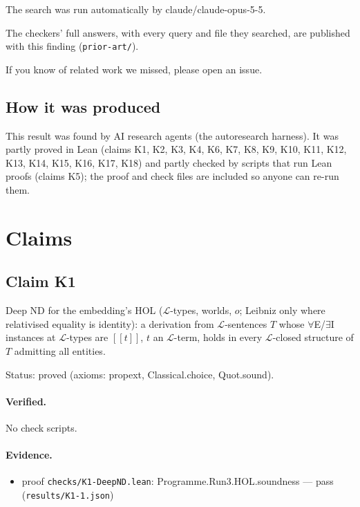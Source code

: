\documentclass{article}
\begin{document}
The search was run automatically by claude/claude-opus-5-5.

The checkers' full answers, with every query and file they searched, are published with this finding (\texttt{prior-art/}).

If you know of related work we missed, please open an issue.

\subsection*{How it was produced}

This result was found by AI research agents (the autoresearch harness). It was partly proved in Lean (claims K1, K2, K3, K4, K6, K7, K8, K9, K10, K11, K12, K13, K14, K15, K16, K17, K18) and partly checked by scripts that run Lean proofs (claims K5); the proof and check files are included so anyone can re-run them.

\section{Claims}

\subsection*{Claim K1}

Deep ND for the embedding's HOL ($\mathcal{L}$-types, worlds, $o$; Leibniz only where relativised equality is identity): a derivation from $\mathcal{L}$-sentences $T$ whose $\forall$E/$\exists$I instances at $\mathcal{L}$-types are $[\![t]\!]$, $t$ an $\mathcal{L}$-term, holds in every $\mathcal{L}$-closed structure of $T$ admitting all entities.

Status: proved (axioms: propext, Classical.choice, Quot.sound).

\paragraph{Verified.}
No check scripts.

\paragraph{Evidence.}
\begin{itemize}
\item proof \texttt{checks/K1-DeepND.lean}: Programme.Run3.HOL.soundness --- pass (\texttt{results/K1-1.json})
\end{itemize}
\end{document}
